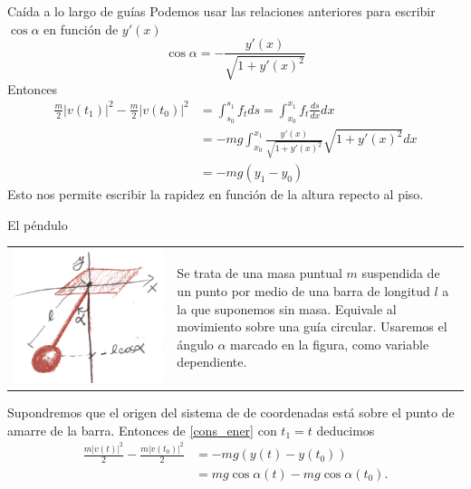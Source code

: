 \documentclass[handout,hyperref={colorlinks=true}]{beamer}
\begin{document}
\begin{frame}{Caída a lo largo de guías}
Podemos usar las relaciones anteriores para escribir $\cos\alpha$ en función de $y'(x)$
\begin{equation}\label{cos_alpha}\cos\alpha=-\frac{y'(x)}{\sqrt{1+y'(x)^2}}\end{equation}
Entonces
\begin{equation}\label{cons_ener}
 \begin{split} \frac{m}{2}|v(t_1)|^2-\frac{m}{2}|v(t_0)|^2&=\int_{s_0}^{s_1}f_tds =\int_{x_0}^{x_1}f_t\frac{ds}{dx}dx\\
&= -mg\int_{x_0}^{x_1}\frac{y'(x)}{\sqrt{1+y'(x)^2}}\sqrt{1+y'(x)^2}dx\\
&=-mg\left(y_1-y_0\right)
    \end{split}\end{equation}
Esto nos permite escribir la rapidez en función de la altura repecto al piso.
\end{frame}



\begin{frame}{El péndulo}
\begin{tabular}{m{4cm} m{5.5cm}}
 \includegraphics[scale=.07]{imagenes/pendulo.jpg} & Se trata de una masa puntual $m$ suspendida de un punto por medio de una barra de longitud $l$
 a la que suponemos sin masa. Equivale al movimiento sobre una guía circular.  Usaremos el ángulo $\alpha$ marcado en la figura, como variable dependiente.
\end{tabular}
Supondremos que el origen del sistema de de coordenadas está sobre el punto de amarre de la barra. Entonces de \eqref{cons_ener} con $t_1=t$ deducimos 
\[\begin{split}\frac{m|v(t)|^2}{2}-\frac{m|v(t_0)|^2}{2}&=-mg\left(y(t)-y(t_0)\right)\\
  &=mg\cos\alpha(t)-mg\cos\alpha(t_0).
   \end{split}
\]
\end{frame}
\end{document}
